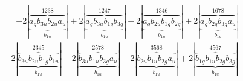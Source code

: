 \documentclass{article}
\begin{document}
\begin{multline*}
=-2\left|\underbrace{\overbrace{a_{g} b_{3u} b_{2u} a_{u}}^{1 2 3 8}}_{b_{1u}}\right|+2\left|\underbrace{\overbrace{a_{g} b_{3u} b_{1g} b_{3g}}^{1 2 4 7}}_{b_{1u}}\right|+2\left|\underbrace{\overbrace{a_{g} b_{2u} b_{1g} b_{2g}}^{1 3 4 6}}_{b_{1u}}\right|+2\left|\underbrace{\overbrace{a_{g} b_{2g} b_{3g} a_{u}}^{1 6 7 8}}_{b_{1u}}\right|\\
-2\left|\underbrace{\overbrace{b_{3u} b_{2u} b_{1g} b_{1u}}^{2 3 4 5}}_{b_{1u}}\right|-2\left|\underbrace{\overbrace{b_{3u} b_{1u} b_{3g} a_{u}}^{2 5 7 8}}_{b_{1u}}\right|-2\left|\underbrace{\overbrace{b_{2u} b_{1u} b_{2g} a_{u}}^{3 5 6 8}}_{b_{1u}}\right|+2\left|\underbrace{\overbrace{b_{1g} b_{1u} b_{2g} b_{3g}}^{4 5 6 7}}_{b_{1u}}\right|
\end{multline*}
\\\\
\end{document}
